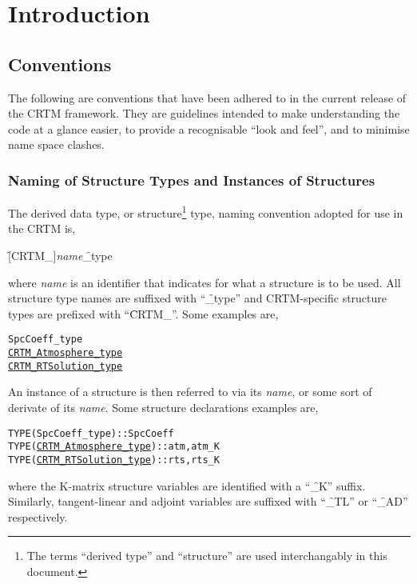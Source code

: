 \chapter{Introduction}

\section{Conventions}
\label{sec:conventions}
The following are conventions that have been adhered to in the current release of the CRTM framework. They are guidelines intended to make understanding the code at a glance easier, to provide a recognisable ``look and feel'', and to minimise name space clashes.

\subsection{Naming of Structure Types and Instances of Structures}
The derived data type, or structure\footnote{The terms ``derived type'' and ``structure'' are used interchangably in this document.} type, naming convention adopted for use in the CRTM is, 

\hspace{0.5cm}\f{[CRTM\_]}\textit{name}\f{\_type} 

where \textit{name} is an identifier that indicates for what a structure is to be used. All structure type names are suffixed with ``\f{\_type}'' and CRTM-specific structure types are prefixed with ``\f{CRTM\_}''. Some examples are,
\begin{alltt}
  SpcCoeff_type
  \hyperref[sec:atmosphere_structure]{CRTM_Atmosphere_type}
  \hyperref[sec:rtsolution_structure]{CRTM_RTSolution_type}\end{alltt}
An instance of a structure is then referred to via its \textit{name}, or some sort of derivate of its \textit{name}. Some structure declarations examples are,
\begin{alltt}
  TYPE(SpcCoeff_type)        :: SpcCoeff
  TYPE(\hyperref[sec:atmosphere_structure]{CRTM_Atmosphere_type}) :: atm, atm_K
  TYPE(\hyperref[sec:rtsolution_structure]{CRTM_RTSolution_type}) :: rts, rts_K\end{alltt}
where the K-matrix structure variables are identified with a ``\f{\_K}'' suffix. Similarly, tangent-linear and adjoint variables are suffixed with ``\f{\_TL}'' or ``\f{\_AD}'' respectively.

